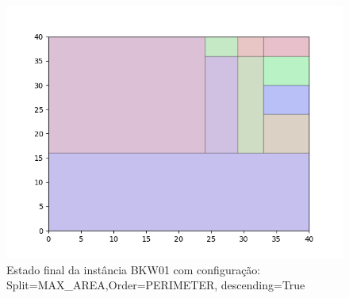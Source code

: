 \begin{figure}[H]
    \centering
    \caption[]{Estado final da instância BKW01 com configuração: Split=MAX_AREA,Order=PERIMETER, descending=True}
    \label{fig:bkw01-max_area-perimeter-true}
    \includegraphics[scale=0.5]{output/figures/bkw/bkw01/max_area/perimeter/true/00}
\end{figure}